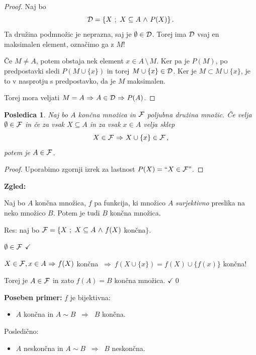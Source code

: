 \documentclass[11pt,paper=b5,footinclude,headinclude]{scrbook} %
\def\inn {{~\wedge~}}
\def\sledi {{~\Rightarrow~}}
\def\brez {{\,\setminus\,}}
\newtheorem*{posledica}{Posledica}
\begin{document}
\begin{proof}
Naj bo
$${\cal D} = \{X~;~X\subseteq A \inn P(X)\}\,.$$
Ta družina podmnožic je neprazna, saj je $\emptyset\in {\cal D}$.
Torej ima ${\cal D}$ vsaj en maksimalen element, označimo ga z $M$!

Če $M\neq A$, potem obstaja nek element $x\in A\brez M$. Ker pa je
$P(M)$, po predpostavki sledi $P(M\cup \{x\})$ in torej $M\cup \{x\}\in{\cal D}$.
Ker je $M\subset M\cup \{x\}$, je to v nasprotju s predpostavko, da je $M$ maksimalen.

Torej mora veljati $M = A\sledi A\in {\cal D}\sledi P(A)$.
\end{proof}

\begin{posledica}
Naj bo $A$ končna množica in ${\cal F}$ poljubna družina množic.
Če velja $\emptyset\in {\cal F}$ in če za vsak $X\subseteq A$ in za vsak $x\in A$ velja sklep
$$X\in {\cal F}\sledi X\cup \{x\}\in {\cal F}\,,$$
potem je $A\in {\cal F}$.
\end{posledica}

\begin{proof}
Uporabimo zgornji izrek za lastnost $P(X) = ``X\in {\cal F}"$.
\end{proof}

\textbf{Zgled:}

Naj bo $A$ končna množica, $f$ pa funkcija, ki množico $A$ {\em surjektivno} preslika na neko množico $B$. Potem je tudi $B$ končna množica.

\medskip
Res:  naj bo  ${\cal F} =\{X~;~X\subseteq A \inn f(X)$ končna$\}$.

$\emptyset\in {\cal F}$ $\checkmark$

$X\in {\cal F}, x\in A\sledi f(X)$ končna $\sledi
f(X\cup \{x\}) = f(X) \cup \{f(x)\}$ končna!

Torej je $A\in {\cal F}$ in zato $f(A) = B$ končna množica. $\checkmark$\qed

\bigskip
\textbf{Poseben primer:} $f$ je bijektivna:

\begin{itemize}
\item $A$ končna in $A\sim B$ $\sledi$ $B$ končna.
\end{itemize}

Posledično:
\begin{itemize}
\item $A$ neskončna in $A\sim B$ $\sledi$ $B$ neskončna.
\end{itemize}

\bigskip
\end{document}

